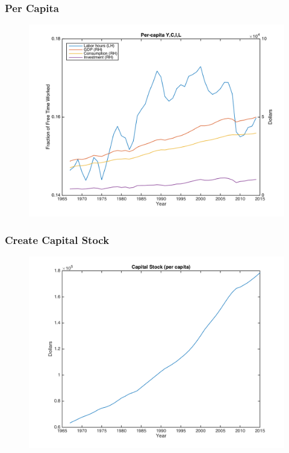 \documentclass{beamer}
\begin{document}
\begin{frame}
\frametitle[alignment=center]{Per Capita}
\begin{figure}
\centering
\includegraphics[scale=0.5]{Figures/Figure_2.png}
\end{figure}
\end{frame}

\begin{frame}
\frametitle[alignment=center]{Create Capital Stock}
\begin{figure}
\centering
\includegraphics[scale=0.5]{Figures/Figure_3.png}
\end{figure}
\end{frame}
\end{document}

